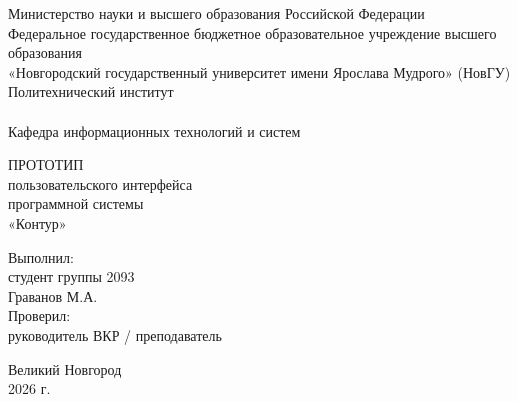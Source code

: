 \begin{titlepage}
\begin{center}

Министерство науки и высшего образования Российской Федерации
\\
Федеральное государственное бюджетное образовательное учреждение 
высшего образования
\\
«Новгородский государственный университет имени Ярослава Мудрого» (НовГУ)
\\
Политехнический институт
\\
\tiny\underline{\hspace{16cm}}
\\
\normalsize \lsstyle Кафедра информационных технологий и систем
\\
\end{center}

\vspace*{25mm}

\begin{center}
ПРОТОТИП
\\
пользовательского интерфейса
\\
программной системы
\\
«Контур»
\\
\end{center}

\vspace*{20mm}

\begin{flushright}
\begin{minipage}[t]{0.52\textwidth}
Выполнил:
\\
студент группы 2093
\\
Граванов М.А.
\\
Проверил:
\\
руководитель ВКР / преподаватель
\\
\underline{\hspace{55mm}}
\end{minipage}
\end{flushright}

\vfill

\begin{center}
Великий Новгород
\\
2026 г.
\end{center}
\end{titlepage}
\restoregeometry
\addtocounter{page}{1}
